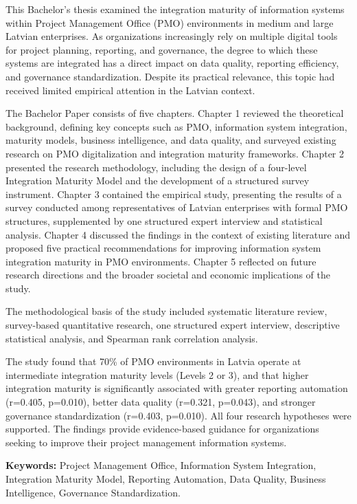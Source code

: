 \frontmatterpage
{}

This Bachelor's thesis examined the integration maturity of information systems
within Project Management Office (PMO) environments in medium and large Latvian
enterprises. As organizations increasingly rely on multiple digital tools for
project planning, reporting, and governance, the degree to which these systems
are integrated has a direct impact on data quality, reporting efficiency, and
governance standardization. Despite its practical relevance, this topic had
received limited empirical attention in the Latvian context.

The Bachelor Paper consists of five chapters. Chapter 1 reviewed the theoretical
background, defining key concepts such as PMO, information system integration,
maturity models, business intelligence, and data quality, and surveyed existing
research on PMO digitalization and integration maturity frameworks. Chapter 2
presented the research methodology, including the design of a four-level
Integration Maturity Model and the development of a structured survey instrument.
Chapter 3 contained the empirical study, presenting the results of a survey
conducted among representatives of Latvian enterprises with formal PMO structures,
supplemented by one structured expert interview and statistical analysis. Chapter 4
discussed the findings in the context of existing literature and proposed five
practical recommendations for improving information system integration maturity
in PMO environments. Chapter 5 reflected on future research directions and the
broader societal and economic implications of the study.

The methodological basis of the study included systematic literature review,
survey-based quantitative research, one structured expert interview, descriptive
statistical analysis, and Spearman rank correlation analysis.

The study found that 70\% of PMO environments in Latvia operate at intermediate
integration maturity levels (Levels 2 or 3), and that higher integration maturity
is significantly associated with greater reporting automation (r=0.405, p=0.010),
better data quality (r=0.321, p=0.043), and stronger governance standardization
(r=0.403, p=0.010). All four research hypotheses were supported. The findings
provide evidence-based guidance for organizations seeking to improve their project
management information systems.

\thesisscopeEN

\textbf{Keywords:} Project Management Office, Information System Integration,
Integration Maturity Model, Reporting Automation, Data Quality, Business
Intelligence, Governance Standardization.
